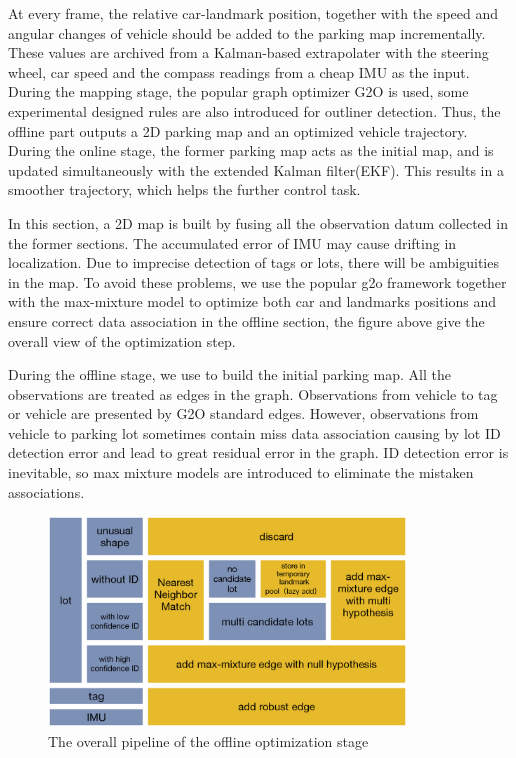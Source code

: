 \documentclass[journal]{IEEEtran}
\begin{document}

At every frame, the relative car-landmark position, together with the speed and angular changes of vehicle should be added to the parking map incrementally. 
These values are archived from a Kalman-based extrapolater with the steering wheel, car speed and the compass readings from a cheap IMU as the input.
During the mapping stage, the popular graph optimizer G2O is used, some experimental designed rules are also introduced for outliner detection. 
Thus, the offline part outputs a 2D parking map and an optimized vehicle trajectory. 
During the online stage, the former parking map acts as the initial map, and is updated simultaneously with the extended Kalman filter(EKF). 
This results in a smoother trajectory, which helps the further control task.

%


In this section, a 2D map is built by fusing all the observation datum collected in the former sections. 
The accumulated error of IMU may cause drifting in localization. 
Due to imprecise detection of tags or lots, there will be ambiguities in the map. 
To avoid these problems, we use the popular g2o\cite{K2011G2o} framework together with the max-mixture model \cite{Pfingsthorn2014Representing} to optimize both car and landmarks positions and ensure correct data association in the offline section, the figure above give the overall view of the optimization step.

During the offline stage, we use \cite{K2011G2o} to build the initial parking map. 
All the observations are treated as edges in the graph. 
Observations from vehicle to tag or vehicle are presented by G2O standard edges. 
However, observations from vehicle to parking lot sometimes contain miss data association causing by lot ID detection error and lead to great residual error in the graph. 
ID detection error is inevitable, so max mixture models \cite{Pfingsthorn2014Representing} are introduced to eliminate the mistaken associations.

\begin{figure}
\centering
\includegraphics[height = 2.2in]{pic/fig8_Optimize}
\caption{
The overall pipeline of the offline optimization stage
}\label{fig:8}
\end{figure}
\end{document}
